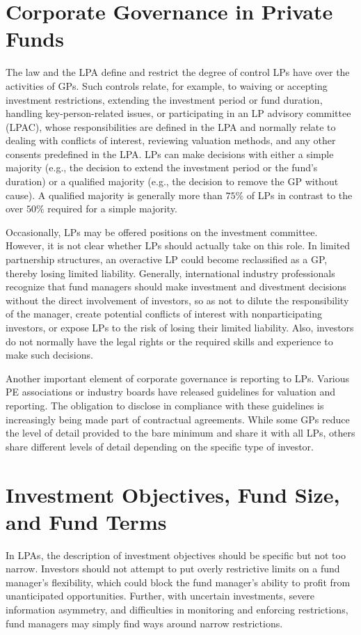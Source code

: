 \documentclass[11pt]{article}
\begin{document}
\section*{Corporate Governance in Private Funds}
The law and the LPA define and restrict the degree of control LPs have over the activities of GPs. Such controls relate, for example, to waiving or accepting investment restrictions, extending the investment period or fund duration, handling key-person-related issues, or participating in an LP advisory committee (LPAC), whose responsibilities are defined in the LPA and normally relate to dealing with conflicts of interest, reviewing valuation methods, and any other consents predefined in the LPA. LPs can make decisions with either a simple majority (e.g., the decision to extend the investment period or the fund's duration) or a qualified majority (e.g., the decision to remove the GP without cause). A qualified majority is generally more than $75 \%$ of LPs in contrast to the over $50 \%$ required for a simple majority.

Occasionally, LPs may be offered positions on the investment committee. However, it is not clear whether LPs should actually take on this role. In limited partnership structures, an overactive LP could become reclassified as a GP, thereby losing limited liability. Generally, international industry professionals recognize that fund managers should make investment and divestment decisions without the direct involvement of investors, so as not to dilute the responsibility of the manager, create potential conflicts of interest with nonparticipating investors, or expose LPs to the risk of losing their limited liability. Also, investors do not normally have the legal rights or the required skills and experience to make such decisions.

Another important element of corporate governance is reporting to LPs. Various PE associations or industry boards have released guidelines for valuation and reporting. The obligation to disclose in compliance with these guidelines is increasingly being made part of contractual agreements. While some GPs reduce the level of detail provided to the bare minimum and share it with all LPs, others share different levels of detail depending on the specific type of investor.

\section*{Investment Objectives, Fund Size, and Fund Terms}
In LPAs, the description of investment objectives should be specific but not too narrow. Investors should not attempt to put overly restrictive limits on a fund manager's flexibility, which could block the fund manager's ability to profit from unanticipated opportunities. Further, with uncertain investments, severe information asymmetry, and difficulties in monitoring and enforcing restrictions, fund managers may simply find ways around narrow restrictions.
\end{document}
